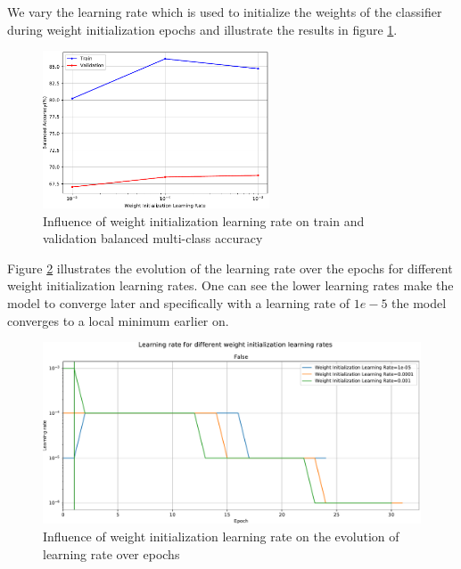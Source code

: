     We vary the learning rate which is used to initialize the weights of the classifier during weight initialization epochs and illustrate the results in figure \ref{fig:wilr_comp}. \par
    \begin{figure}[ht]
        \centering
        \includegraphics[width=0.6\textwidth]{figs/densenet201_wilr_comp.pdf}
        \caption{Influence of weight initialization learning rate on train and validation balanced multi-class accuracy}
        \label{fig:wilr_comp}
    \end{figure}
    
    Figure \ref{fig:wilr_lr_over_epochs} illustrates the evolution of the learning rate over the epochs for different weight initialization learning rates. One can see the lower learning rates make the model to converge later and specifically with a learning rate of $1e-5$ the model converges to a local minimum earlier on. \par
    \begin{figure}[ht]
        \centering
        \includegraphics[width=\textwidth]{figs/densenet201_wilr_lr_over_epochs.pdf}
        \caption{Influence of weight initialization learning rate on the evolution of learning rate over epochs}
        \label{fig:wilr_lr_over_epochs}
    \end{figure}
    
